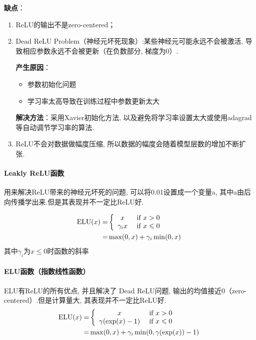 \documentclass[a4paper]{article}
\begin{document}
\textbf{缺点}：
\begin{enumerate} 
    \renewcommand{\labelenumi}{(\theenumi)}
\item  ReLU的输出不是zero-centered； 
\item  Dead ReLU Problem（神经元坏死现象）:某些神经元可能永远不会被激活, 导致相应参数永远不会被更新（在负数部分, 梯度为0）.

\textbf{产生原因}：
\begin{itemize}
    \item 参数初始化问题
    \item 学习率太高导致在训练过程中参数更新太大
\end{itemize}
 \textbf{解决方法}：采用Xavier初始化方法, 以及避免将学习率设置太大或使用adagrad等自动调节学习率的算法.
\item ReLU不会对数据做幅度压缩, 所以数据的幅度会随着模型层数的增加不断扩张.
\end{enumerate}
\paragraph{Leakly  ReLU函数}
用来解决ReLU带来的神经元坏死的问题, 可以将0.01设置成一个变量a, 其中a由后向传播学出来.但是其表现并不一定比ReLU好.

\begin{align*}
\mathrm{ELU}(x)=&
\left\{ 
\begin{array}{c c}    
    x  \ & \text{if} \  x>0 \\    
    \gamma_i x \ & \text{if} \ x \leqslant 0  \\   
\end{array} 
\right. \\
=& \max(0, x)+\gamma_i \min(0, x)
\end{align*}
其中$\gamma_i$为$x \leqslant 0 $时函数的斜率

\paragraph{ELU函数（指数线性函数）}
ELU有ReLU的所有优点, 并且解决了 Dead ReLU问题, 输出的均值接近0（zero-centered）.但是计算量大, 其表现并不一定比ReLU好.
\begin{align*}
    \mathrm{ELU}(x)= &
    \left\{ 
    \begin{array}{c c}    
        x  \ & \text{if} \  x>0 \\    
        \gamma(\exp(x)-1) \ & \text{if} \ x \leqslant 0  \\   
    \end{array} 
    \right. \\
    = & \max(0, x)+\gamma_i \min(0, \gamma(\exp(x))-1)
    \end{align*}
      
\end{document}
